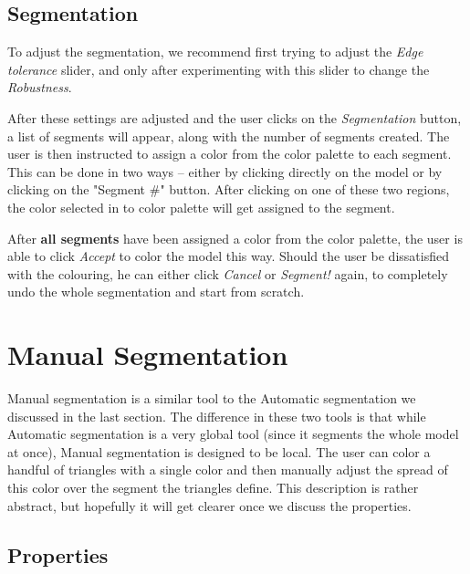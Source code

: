 \subsection{Segmentation}

To adjust the segmentation, we recommend first trying to adjust the \textit{Edge tolerance} slider, and only after experimenting with this slider to change the \textit{Robustness}.

After these settings are adjusted and the user clicks on the \textit{Segmentation} button, a list of segments will appear, along with the number of segments created. The user is then instructed to assign a color from the color palette to each segment. This can be done in two ways -- either by clicking directly on the model or by clicking on the "Segment \#" button. After clicking on one of these two regions, the color selected in to color palette will get assigned to the segment.

After \textbf{all segments} have been assigned a color from the color palette, the user is able to click \textit{Accept} to color the model this way. Should the user be dissatisfied with the colouring, he can either click \textit{Cancel} or \textit{Segment!} again, to completely undo the whole segmentation and start from scratch.


\section{Manual Segmentation}

Manual segmentation is a similar tool to the Automatic segmentation we discussed in the last section. The difference in these two tools is that while Automatic segmentation is a very global tool (since it segments the whole model at once), Manual segmentation is designed to be local. The user can color a handful of triangles with a single color and then manually adjust the spread of this color over the segment the triangles define. This description is rather abstract, but hopefully it will get clearer once we discuss the properties.


\subsection{Properties}

